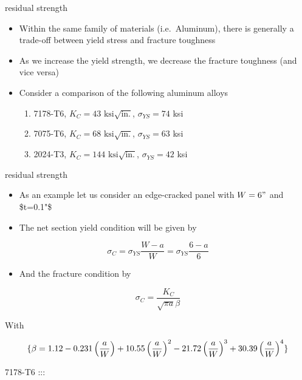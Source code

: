 \documentclass[
  letterpaper,
  ignorenonframetext,
  aspectratio=43,
  handout,
  12pt]{beamer}
\providecommand{\tightlist}{%
  \setlength{\itemsep}{0pt}\setlength{\parskip}{0pt}}
\providecommand{\tightlist}{%
\setlength{\itemsep}{0pt}\setlength{\parskip}{0pt}}
\begin{document}
\begin{frame}{residual strength}
\protect\hypertarget{residual-strength-5}{}
\begin{itemize}
\tightlist
\item
  Within the same family of materials (i.e.~Aluminum), there is
  generally a trade-off between yield stress and fracture toughness
\item
  As we increase the yield strength, we decrease the fracture toughness
  (and vice versa)
\item
  Consider a comparison of the following aluminum alloys

  \begin{enumerate}
  \tightlist
  \item
    7178-T6, \(K_C = 43 \text{ ksi} \sqrt{\text{in.}}\),
    \(\sigma_{YS} = 74\) ksi
  \item
    7075-T6, \(K_C = 68 \text{ ksi} \sqrt{\text{in.}}\),
    \(\sigma_{YS} = 63\) ksi
  \item
    2024-T3, \(K_C = 144 \text{ ksi} \sqrt{\text{in.}}\),
    \(\sigma_{YS} = 42\) ksi
  \end{enumerate}
\end{itemize}
\end{frame}

\begin{frame}{residual strength}
\protect\hypertarget{residual-strength-6}{}
\begin{itemize}
\tightlist
\item
  As an example let us consider an edge-cracked panel with \(W=6"\) and
  \$t=0.1"\$
\item
  The net section yield condition will be given by
\end{itemize}

\[\sigma_C = \sigma_{YS} \frac{W-a}{W} = \sigma_{YS}\frac{6-a}{6}\]

\begin{itemize}
\tightlist
\item
  And the fracture condition by
\end{itemize}

\[\sigma_C = \frac{K_C}{\sqrt{\pi a} \beta}\]

With

\[\small\{\beta = 1.12 - 0.231\left(\frac{a}{W}\right) + 10.55 \left(\frac{a}{W}\right)^2 - 21.72 \left(\frac{a}{W}\right)^3 + 30.39 \left(\frac{a}{W}\right)^4\}\]
\end{frame}

\begin{frame}{7178-T6}
\protect\hypertarget{t6}{}
:::
\end{frame}
\end{document}
